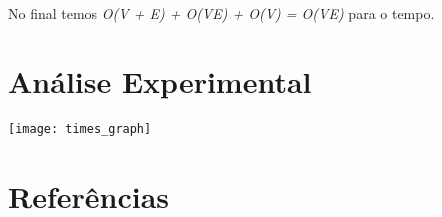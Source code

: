 \documentclass[12pt, a4paper]{article}
\begin{document}
\paragraph{}
No final temos \textit{O(V + E) + O(VE) + O(V) = O(VE)} para o tempo.

\section{Análise Experimental}
\paragraph{}
\texttt{[image: times\_graph]}

\section{Referências}
\paragraph{}
\end{document}
